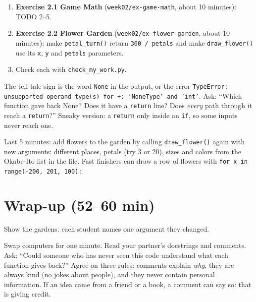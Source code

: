 \begin{enumerate}[leftmargin=1.4em]
  \item \textbf{Exercise 2.1 Game Math} (\texttt{week02/ex-game-math}, about 10 minutes): TODO 2--5.
  \item \textbf{Exercise 2.2 Flower Garden} (\texttt{week02/ex-flower-garden}, about 10 minutes): make \texttt{petal\_turn()} return
        \texttt{360 / petals} and make \texttt{draw\_flower()} use its \texttt{x}, \texttt{y} and \texttt{petals} parameters.
  \item Check each with \texttt{check\_my\_work.py}.
\end{enumerate}

\begin{bughunt}
The tell-tale sign is the word \texttt{None} in the output, or the error
\texttt{TypeError: unsupported operand type(s) for +: 'NoneType' and 'int'}.
Ask: \enquote{Which function gave back None? Does it have a \texttt{return} line? Does \emph{every} path through it reach a \texttt{return}?}
Sneaky version: a \texttt{return} only inside an \texttt{if}, so some inputs never reach one.
\end{bughunt}

\begin{freebuild}
Last 5 minutes: add flowers to the garden by calling \texttt{draw\_flower()} again with new arguments: different places,
petals (try 3 or 20), sizes and colors from the Okabe-Ito list in the file. Fast finishers can draw a row of flowers with
\texttt{for x in range(-200, 201, 100):}.
\end{freebuild}

\section{Wrap-up (52--60 min)}
Show the gardens: each student names one argument they changed.

\begin{safety}
Swap computers for one minute. Read your partner's docstrings and comments. Ask: \enquote{Could someone who has never seen this
code understand what each function gives back?} Agree on three rules: comments explain \emph{why}, they are always kind
(no jokes about people), and they never contain personal information. If an idea came from a friend or a book, a comment can say so:
that is giving credit.
\end{safety}

